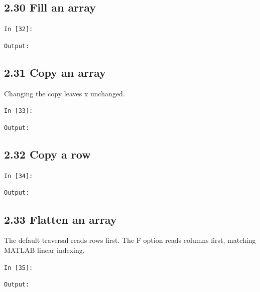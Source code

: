 \documentclass[11pt]{article}
\begin{document}
\par\medskip\noindent\begin{minipage}{\linewidth}
\subsection*{2.30 Fill an array}
\noindent\texttt{In [32]:}

\noindent\texttt{Output:}

\end{minipage}\par

\par\medskip\noindent\begin{minipage}{\linewidth}
\subsection*{2.31 Copy an array}
Changing the copy leaves x unchanged.

\noindent\texttt{In [33]:}

\noindent\texttt{Output:}

\end{minipage}\par

\par\medskip\noindent\begin{minipage}{\linewidth}
\subsection*{2.32 Copy a row}
\noindent\texttt{In [34]:}

\noindent\texttt{Output:}

\end{minipage}\par

\par\medskip\noindent\begin{minipage}{\linewidth}
\subsection*{2.33 Flatten an array}
The default traversal reads rows first. The F option reads columns first, matching MATLAB linear indexing.

\noindent\texttt{In [35]:}

\noindent\texttt{Output:}

\end{minipage}\par
\end{document}
